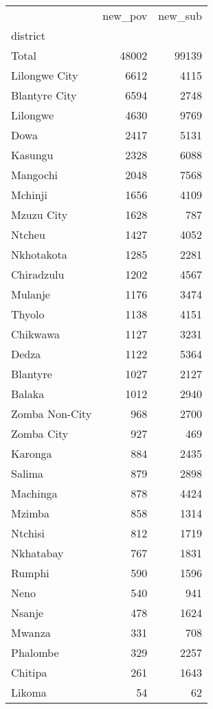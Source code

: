 \begin{tabular}{lrr}
\toprule
{} &  new\_pov &  new\_sub \\
district       &          &          \\
\midrule
Total          &    48002 &    99139 \\
Lilongwe City  &     6612 &     4115 \\
Blantyre City  &     6594 &     2748 \\
Lilongwe       &     4630 &     9769 \\
Dowa           &     2417 &     5131 \\
Kasungu        &     2328 &     6088 \\
Mangochi       &     2048 &     7568 \\
Mchinji        &     1656 &     4109 \\
Mzuzu City     &     1628 &      787 \\
Ntcheu         &     1427 &     4052 \\
Nkhotakota     &     1285 &     2281 \\
Chiradzulu     &     1202 &     4567 \\
Mulanje        &     1176 &     3474 \\
Thyolo         &     1138 &     4151 \\
Chikwawa       &     1127 &     3231 \\
Dedza          &     1122 &     5364 \\
Blantyre       &     1027 &     2127 \\
Balaka         &     1012 &     2940 \\
Zomba Non-City &      968 &     2700 \\
Zomba City     &      927 &      469 \\
Karonga        &      884 &     2435 \\
Salima         &      879 &     2898 \\
Machinga       &      878 &     4424 \\
Mzimba         &      858 &     1314 \\
Ntchisi        &      812 &     1719 \\
Nkhatabay      &      767 &     1831 \\
Rumphi         &      590 &     1596 \\
Neno           &      540 &      941 \\
Nsanje         &      478 &     1624 \\
Mwanza         &      331 &      708 \\
Phalombe       &      329 &     2257 \\
Chitipa        &      261 &     1643 \\
Likoma         &       54 &       62 \\
\bottomrule
\end{tabular}
